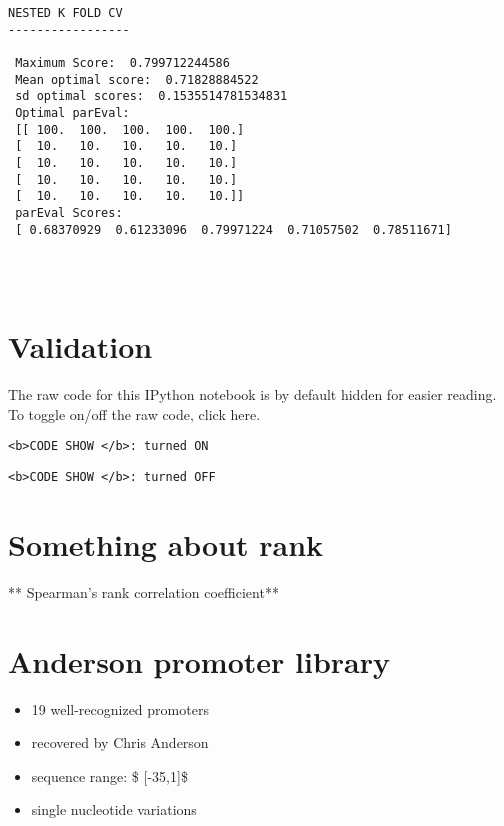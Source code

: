 \documentclass[11pt]{article}
\providecommand{\tightlist}{%
      \setlength{\itemsep}{0pt}\setlength{\parskip}{0pt}}
\begin{document}
    \begin{Verbatim}[commandchars=\\\{\}]
NESTED K FOLD CV 
----------------- 

 Maximum Score:  0.799712244586 
 Mean optimal score:  0.71828884522 
 sd optimal scores:  0.1535514781534831 
 Optimal parEval:
 [[ 100.  100.  100.  100.  100.]
 [  10.   10.   10.   10.   10.]
 [  10.   10.   10.   10.   10.]
 [  10.   10.   10.   10.   10.]
 [  10.   10.   10.   10.   10.]] 
 parEval Scores:
 [ 0.68370929  0.61233096  0.79971224  0.71057502  0.78511671] 




    \end{Verbatim}

    \section{Validation}\label{validation}

The raw code for this IPython notebook is by default hidden for easier
reading. To toggle on/off the raw code, click here.

\begin{verbatim}
<b>CODE SHOW </b>: turned ON
\end{verbatim}

\begin{verbatim}
<b>CODE SHOW </b>: turned OFF
\end{verbatim}

    \section{Something about rank}\label{something-about-rank}

** Spearman's rank correlation coefficient**

    \section{Anderson promoter library}\label{anderson-promoter-library}

\begin{itemize}
\tightlist
\item
  19 well-recognized promoters
\item
  recovered by Chris Anderson
\item
  sequence range: \$ {[}-35,1{]}\$
\item
  single nucleotide variations
\end{itemize}
\end{document}
